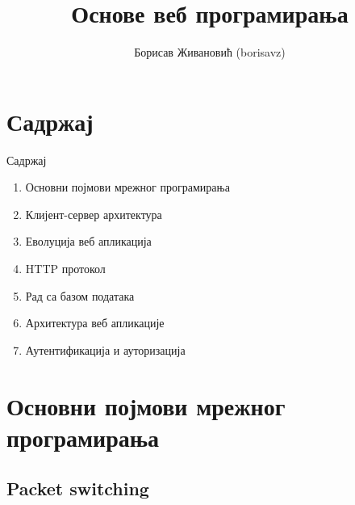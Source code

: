 \documentclass{beamer}
\title{Основе веб програмирања}
\author{Борисав Живановић (borisavz)}
\begin{document}
    \begin{frame}
        \maketitle
    \end{frame}

    \section{Садржај}

    \begin{frame}{Садржај}
        \begin{enumerate}
            \item Основни појмови мрежног програмирања
            \item Клијент-сервер архитектура
            \item Еволуција веб апликација
            \item HTTP протокол
            \item Рад са базом података
            \item Архитектура веб апликације
            \item Аутентификација и ауторизација
        \end{enumerate}
    \end{frame}

    \section{Основни појмови мрежног програмирања}
    \subsection{Packet switching}
\end{document}
